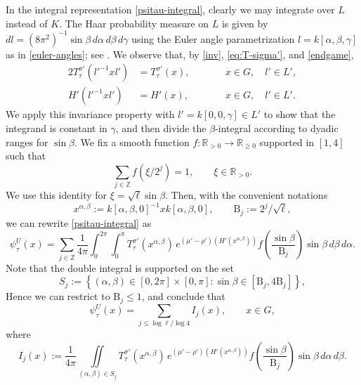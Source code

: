 \documentclass[11pt,oneside]{amsart}
\numberwithin{equation}{section}
\theoremstyle{remark}
\theoremstyle{plain}
\newcommand\BB{\mathrm{B}}
\newcommand\ZZ{\mathbb{Z}}
\newcommand\RR{\mathbb{R}}
\renewcommand\leq{\leqslant}
\renewcommand\geq{\geqslant}
\begin{document}
In the integral representation \eqref{psitau-integral}, clearly we may integrate over $L$ instead of $K$. The Haar probability measure on $L$ is given by $dl=(8\pi^2)^{-1}\sin\beta\,d\alpha\,d\beta\,d\gamma$ using the Euler angle parametrization $l=k[\alpha,\beta,\gamma]$ as in \eqref{euler-angles}; see \cite[\S2.2.1]{Buttcane2018}. We observe that, by \eqref{inv}, \eqref{eq:T-sigma'}, and \eqref{endgame},
\begin{alignat*}{2}
T_{\tau}^{\sigma'}(l'^{-1}xl') &= T_{\tau}^{\sigma'}(x),&&\qquad x\in G,\quad l'\in L',\\
H'(l'^{-1}xl') &= H'(x),&&\qquad x\in G,\quad l'\in L'.
\end{alignat*}
We apply this invariance property with $l'=k[0,0,\gamma]\in L'$ to
show that the integrand is constant in $\gamma$, and then divide the $\beta$-integral according to dyadic ranges for $\sin\beta$. We fix a smooth function $f:\RR_{>0}\to\RR_{\geq 0}$ supported in $[1,4]$ such that
\[
\sum_{j\in\ZZ} f(\xi/2^j)=1, \qquad \xi\in\RR_{>0}.
\]
We use this identity for $\xi=\sqrt{\ell}\sin\beta$. Then, with the convenient notations
\[
x^{\alpha,\beta}:=k[\alpha,\beta,0]^{-1}xk[\alpha,\beta,0],\qquad\BB_j:=2^j/\sqrt{\ell},
\]
we can rewrite \eqref{psitau-integral} as
\[\psi_{\tau}^{U}(x)=\sum_{j\in\ZZ}\frac{1}{4\pi}\int_0^{2\pi}\int_0^\pi
T_\tau^{\sigma'}(x^{\alpha,\beta})\,e^{(\mu'-\rho')(H'(x^{\alpha,\beta}))}f\left(\frac{\sin\beta}{\BB_j}\right)\sin\beta\,d\beta\,d\alpha.\]
Note that the double integral is supported on the set
\[S_j:=\left\{(\alpha,\beta)\in[0,2\pi]\times [0,\pi]: \sin\beta\in [\BB_j,4\BB_j]\right\},\]
Hence we can restrict to $\BB_j\leq 1$, and conclude that
\begin{equation}
\label{to-estimate-1}
\psi_{\tau}^{U}(x)=\sum_{j\leq\log\ell/\log 4}I_j(x),\qquad x\in G,
\end{equation}
where
\begin{equation}\label{to-estimate}
I_j(x):=\frac{1}{4\pi}\iint\limits_{(\alpha,\beta) \in S_j}
T_\tau^{\sigma'}(x^{\alpha,\beta})\,e^{(\mu'-\rho')(H'(x^{\alpha,\beta}))}f\left(\frac{\sin\beta}{\BB_j}\right)\sin\beta\,d\alpha\,d\beta.
\end{equation}
\end{document}
